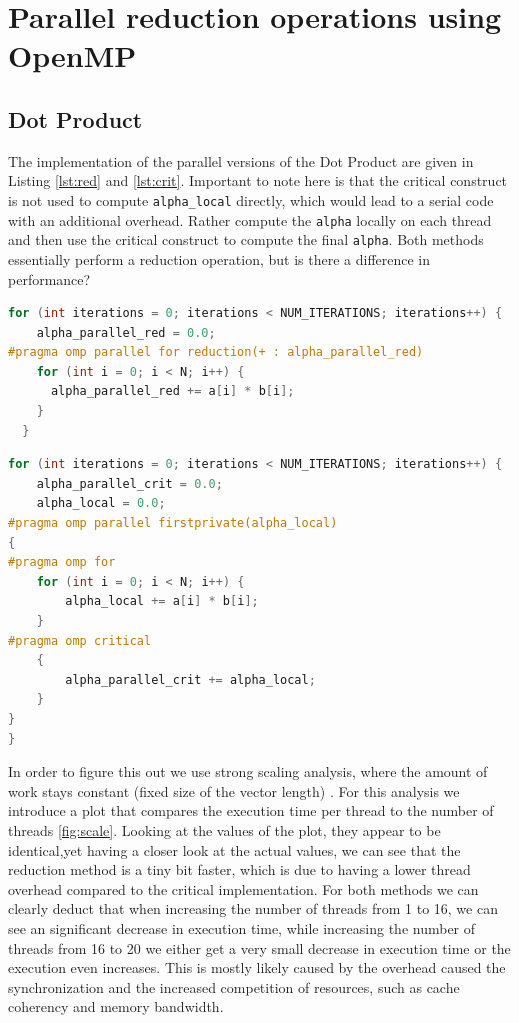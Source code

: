 \section{Parallel reduction operations using OpenMP}
\subsection{Dot Product}
The implementation of the parallel versions of the Dot Product are given in Listing \ref{lst:red} and \ref{lst:crit}.
Important to note here is that the critical construct is not used to compute \texttt{alpha\_local} directly, which would lead to a serial code with an additional overhead. Rather compute the \texttt{alpha} locally on each thread and then use the critical construct to compute the final \texttt{alpha}. Both methods essentially perform a reduction operation, but is there a difference in performance? \newline
\begin{minipage}{.48\textwidth}
\begin{lstlisting}[language=C++, caption=Reduction Method, label=lst:red]
  for (int iterations = 0; iterations < NUM_ITERATIONS; iterations++) {
    alpha_parallel_red = 0.0;
#pragma omp parallel for reduction(+ : alpha_parallel_red)
    for (int i = 0; i < N; i++) {
      alpha_parallel_red += a[i] * b[i];
    }
  }

\end{lstlisting}
\end{minipage}\hfill
\begin{minipage}{.48\textwidth}
\begin{lstlisting}[language=C++, caption=Critical Section Method, label=lst:crit]
for (int iterations = 0; iterations < NUM_ITERATIONS; iterations++) {
	alpha_parallel_crit = 0.0;
	alpha_local = 0.0;
#pragma omp parallel firstprivate(alpha_local)
{
#pragma omp for
	for (int i = 0; i < N; i++) {
		alpha_local += a[i] * b[i];
	}
#pragma omp critical
	{
		alpha_parallel_crit += alpha_local;
	}
}
}

\end{lstlisting}
\end{minipage} \newline
In order to figure this out we use strong scaling analysis, where the amount of work stays constant (fixed size of the vector length) \cite{hager_introduction_2010}.
For this analysis we introduce a plot that compares the execution time per thread to the number of threads \ref{fig:scale}. Looking at the values of the plot, they appear to be identical,yet having a closer look at the actual values, we can see that the reduction method is a tiny bit faster, which is due to having a lower thread overhead compared to the critical implementation. For both methods we can clearly deduct that when increasing the number of threads from 1 to 16, we can see an significant decrease in execution time, while increasing the number of threads from 16 to 20 we either get a very small decrease in execution time or the execution even increases. This is mostly likely caused by the overhead caused the synchronization and the increased competition of resources, such as cache coherency and memory bandwidth.
